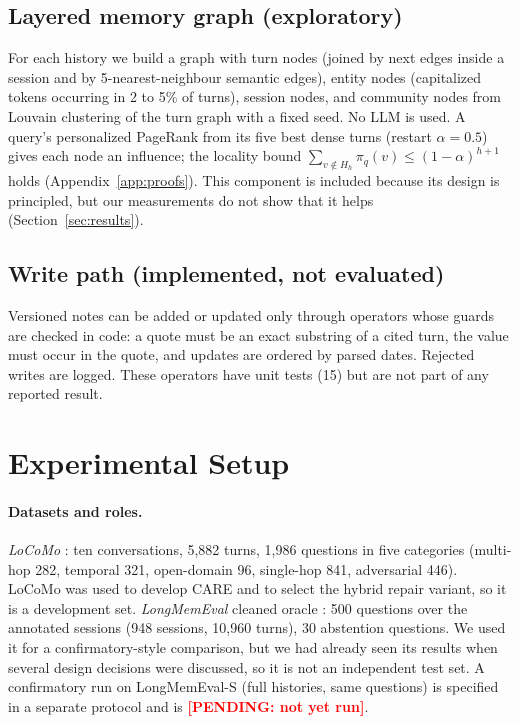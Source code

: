 \documentclass[10pt]{article}
\theoremstyle{plain}
\newcommand{\care}{\textsc{CARE}}
\newcommand{\pending}[1]{\textcolor{red}{\textbf{[PENDING: #1]}}}
\begin{document}
\subsection{Layered memory graph (exploratory)}
\label{sec:graph}

For each history we build a graph with turn nodes (joined by \textsf{next} edges inside a session and by
5-nearest-neighbour semantic edges), entity nodes (capitalized tokens occurring in 2 to 5\% of turns), session
nodes, and community nodes from Louvain clustering of the turn graph with a fixed seed. No LLM is used. A
query's personalized PageRank from its five best dense turns (restart $\alpha=0.5$) gives each node an
influence; the locality bound $\sum_{v\notin H_h}\pi_q(v)\le(1-\alpha)^{h+1}$ holds
(Appendix~\ref{app:proofs}). This component is included because its design is principled, but our
measurements do not show that it helps (Section~\ref{sec:results}).

\subsection{Write path (implemented, not evaluated)}

Versioned notes can be added or updated only through operators whose guards are checked in code: a quote
must be an exact substring of a cited turn, the value must occur in the quote, and updates are ordered by
parsed dates. Rejected writes are logged. These operators have unit tests (15) but are not part of any
reported result.

\section{Experimental Setup}
\label{sec:setup}

\paragraph{Datasets and roles.} \emph{LoCoMo} \citep{maharana2024locomo}: ten conversations, 5,882 turns, 1,986
questions in five categories (multi-hop 282, temporal 321, open-domain 96, single-hop 841, adversarial 446).
LoCoMo was used to develop \care{} and to select the hybrid repair variant, so it is a development set.
\emph{LongMemEval} cleaned oracle \citep{wu2024longmemeval}: 500 questions over the annotated sessions
(948 sessions, 10,960 turns), 30 abstention questions. We used it for a confirmatory-style comparison, but
we had already seen its results when several design decisions were discussed, so it is not an independent
test set. A confirmatory run on LongMemEval-S (full histories, same questions) is specified in a separate
protocol and is \pending{not yet run}.
\end{document}
